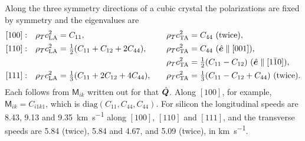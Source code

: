 Along the three symmetry directions of a cubic crystal the polarizations are fixed by symmetry and the eigenvalues are
\begin{equation}
  \begin{aligned}
    [100]:&\quad \rho_Tc_{\mathrm{LA}}^2 = C_{11}, &\quad \rho_Tc_{\mathrm{TA}}^2 &= C_{44}\ (\text{twice}), \\
    [110]:&\quad \rho_Tc_{\mathrm{LA}}^2 = \tfrac12(C_{11} + C_{12} + 2C_{44}), &\quad \rho_Tc_{\mathrm{TA}}^2 &= C_{44}\ (\hat{\vect{e}} \parallel [001]), \\
    &&\quad \rho_Tc_{\mathrm{TA}}^2 &= \tfrac12(C_{11} - C_{12})\ (\hat{\vect{e}} \parallel [1\bar10]), \\
    [111]:&\quad \rho_Tc_{\mathrm{LA}}^2 = \tfrac13(C_{11} + 2C_{12} + 4C_{44}), &\quad \rho_Tc_{\mathrm{TA}}^2 &= \tfrac13(C_{11} - C_{12} + C_{44})\ (\text{twice}).
  \end{aligned}
  \label{eq:C.18-cubic}
\end{equation}
Each follows from $\mathsf{M}_{ik}$ written out for that $\hat{\bm{Q}}$. Along $[100]$, for example, $\mathsf{M}_{ik} = C_{i1k1}$, which is $\mathrm{diag}(C_{11}, C_{44}, C_{44})$. For silicon the longitudinal speeds are 8.43, 9.13 and \SI{9.35}{km.s^{-1}} along $[100]$, $[110]$ and $[111]$, and the transverse speeds are 5.84 (twice), 5.84 and 4.67, and 5.09 (twice), in \si{km.s^{-1}}.

